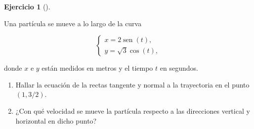 \documentclass[
  a4paper,
]{scrreport}
\theoremstyle{definition}
\newtheorem{exercise}{Ejercicio}[chapter]
\theoremstyle{remark}
\begin{document}
\begin{exercise}[]\protect\hypertarget{exr-cinematica-tangente-normal-trayectoria}{}\label{exr-cinematica-tangente-normal-trayectoria}

Una partícula se mueve a lo largo de la curva

\[
\begin{cases}
x = 2\operatorname{sen}(t), \\
y = \sqrt{3}\cos(t),
\end{cases}
\]

donde \(x\) e \(y\) están medidos en metros y el tiempo \(t\) en
segundos.

\begin{enumerate}
\def\labelenumi{\alph{enumi}.}
\item
  Hallar la ecuación de la rectas tangente y normal a la trayectoria en
  el punto \((1,3/2)\).
\item
  ¿Con qué velocidad se mueve la partícula respecto a las direcciones
  vertical y horizontal en dicho punto?
\end{enumerate}

\end{exercise}
\end{document}
